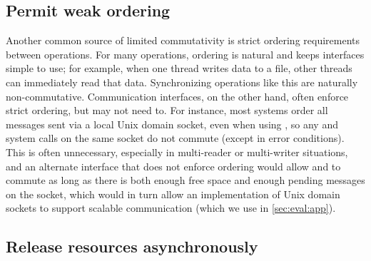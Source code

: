 \subsection{Permit weak ordering}

Another common source of limited commutativity is strict ordering
requirements between operations.  For many operations, ordering is
natural and keeps interfaces simple to use; for example, when one thread
writes data to a file, other threads can immediately read that data.
%
Synchronizing operations like this are naturally non-commutative.
%
Communication interfaces, on the other hand, often enforce strict
ordering, but may not need to.
For instance, most systems order all messages sent via a local Unix
domain socket, even when using
, so any  and  system
calls on the same socket do not commute (except in error conditions).
This is often unnecessary, especially in multi-reader or multi-writer
situations, and an alternate interface that does not enforce ordering
would allow  and  to commute as long as there is
both enough free space and enough pending messages on the socket, which
would in turn allow an implementation of Unix domain sockets to support
scalable communication (which we use in \cref{sec:eval:app}).


\subsection{Release resources asynchronously}


